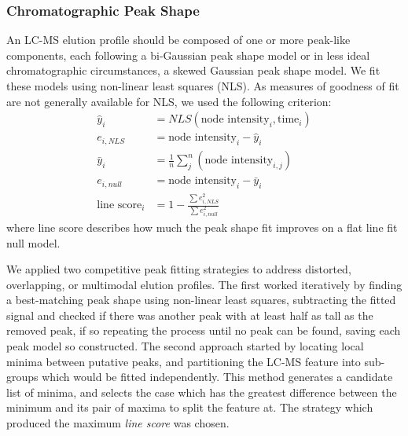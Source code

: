 \documentclass{article}
\begin{document}
\subsubsection{Chromatographic Peak Shape}
An LC-MS elution profile should be composed of one or more peak-like components, each
following a bi-Gaussian peak shape model \cite{Yu2010} or in less ideal chromatographic
circumstances, a skewed Gaussian peak shape model. We fit these models using non-linear
least squares (NLS). As measures of goodness of fit are not generally available for NLS,
we used the following criterion:\begin{align}
    {\hat y_i} &= NLS(\text{node intensity}_i, \text{time}_i) \\
    e_{i, NLS} &= \text{node intensity}_i - {\hat y_i} \\
    {\bar y_i} &= \frac{1}{n}\sum_j^n(\text{node intensity}_{i, j}) \\
    e_{i, null} &= \text{node intensity}_i - {\bar y_i} \\
    \text{line score}_i &= 1 - \frac{\sum{e_{i, NLS}^2}}{\sum{e_{i, null}^2}}
\end{align} where line score describes how much the peak shape fit improves on a flat line
fit null model.

We applied two competitive peak fitting strategies to address distorted, overlapping, or
multimodal elution profiles. The first worked iteratively by finding a best-matching peak
shape using non-linear least squares, subtracting the fitted signal and checked if there was
another peak with at least half as tall as the removed peak, if so repeating the process until
no peak can be found, saving each peak model so constructed. The second approach started
by locating local minima between putative peaks, and partitioning the LC-MS feature into
sub-groups which would be fitted independently. This method generates a candidate list of
minima, and selects the case which has the greatest difference between the minimum and its
pair of maxima to split the feature at. The strategy which produced the maximum {\em line score}
was chosen.
\end{document}
